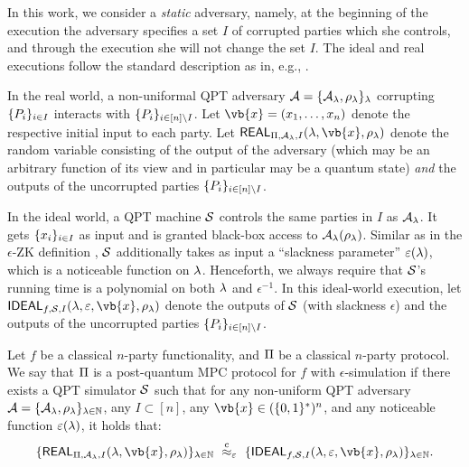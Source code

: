 In this work, we consider a {\em static} adversary, namely, at the
beginning of the execution the adversary specifies a set $I$ of corrupted parties which she controls, and through the execution she will not change the set $I$. The ideal and real executions follow the standard description as in, e.g., \cite{Goldreich04,EPRINT:Lindell16}.

In the real world, a non-uniformal QPT adversary $\mathcal{A}= \{\mathcal{A}_\lambda, \rho_\lambda\}_\lambda$ corrupting $\{P_i\}_{i\in I}$ interacts with $\{P_i\}_{i\in [n] \setminus I}$. Let $\vb{x} = (x_1, \ldots, x_n)$ denote the respective initial input to each party. Let $\REAL_{\Prot, \Adv_\secpar, I}(\secpar, \vb{x}, \rho_\secpar)$ denote the random variable consisting of the output of the adversary (which may be an arbitrary function of its view and in particular may be a quantum state) {\em and} the outputs of the uncorrupted parties $\{P_i\}_{i\in [n] \setminus I}$. 

In the ideal world, a QPT machine $\mathcal{S}$ controls the same parties in $I$ as $\mathcal{A}_\lambda$. It gets $\{x_i\}_{i \in I}$ as input and is granted black-box access to $\mathcal{A}_\lambda(\rho_\lambda)$. Similar as in the $\epsilon$-ZK definition \cite{C:ChiChuYam21,C:CCLY22}, $\mathcal{S}$ additionally takes as input a ``slackness parameter'' $\varepsilon(\lambda)$, which is a noticeable function on $\lambda$. Henceforth, we always require that $\mathcal{S}$'s running time is a polynomial on both $\lambda$ and $\epsilon^{-1}$. In this ideal-world execution, let $\IDEAL_{f,\Sim,I}(\secpar, \epsilon, \vb{x}, \rho_\secpar)$ denote the outputs of $\mathcal{S}$ (with slackness $\epsilon$) and the outputs of the uncorrupted parties $\{P_i\}_{i\in [n] \setminus I}$. 

\begin{definition} \label{def:mpc}
 Let $f$ be a classical $n$-party functionality, and $\mathrm{\Pi}$ be a classical $n$-party protocol. We say that $\mathrm{\Pi}$ is a post-quantum MPC protocol for $f$ with $\epsilon$-simulation if there exists a QPT simulator $\mathcal{S}$ such that for any non-uniform QPT adversary $\mathcal{A} = \{\mathcal{A}_\lambda, \rho_\lambda\}_{\lambda\in\mathbb{N}}$, any $I \subset [n]$, any $\vb{x}\in (\bits^*)^n$, and any noticeable function $\varepsilon(\lambda)$, it holds that:
$$\Set{\REAL_{\Prot, \Adv_\secpar, I}(\secpar, \vb{x}, \rho_\secpar)}_{\secpar \in \Naturals} ~\cind_\epsilon~ \Set{\IDEAL_{f,\Sim,I}(\secpar, \epsilon, \vb{x}, \rho_\secpar)}_{\secpar \in \Naturals}.$$
\end{definition}







